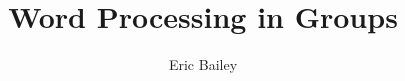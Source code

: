 \documentclass[12pt]{amsart}
\title{Word Processing in Groups}
\author{Eric Bailey}
\begin{document}
\maketitle
\tableofcontents

\newpage
\printglossaries
\end{document}
